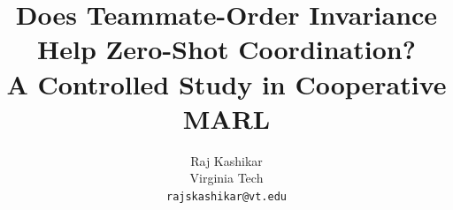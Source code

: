 \documentclass{article}
\title{Does Teammate-Order Invariance Help Zero-Shot Coordination?\\A Controlled Study in Cooperative MARL}
\author{%
  Raj Kashikar \\
  Virginia Tech \\
  \texttt{rajskashikar@vt.edu}
}
\begin{document}
\maketitle

\begin{abstract}

\end{abstract}











\appendix

\end{document}
